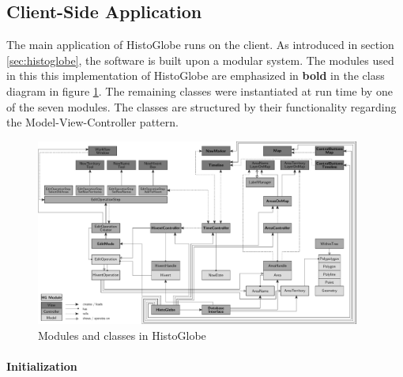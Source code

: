 

\subsection{Client-Side Application} %
\label{sub:client_side_application}

The main application of HistoGlobe runs on the client. As introduced in section \ref{sec:histoglobe}, the software is built upon a modular system. The modules used in this this implementation of HistoGlobe are emphasized in \textbf{bold} in the class diagram in figure \ref{fig:class_diagram}. The remaining classes were instantiated at run time by one of the seven modules. The classes are structured by their functionality regarding the Model-View-Controller pattern.

\begin{figure}
  \centering
  \includegraphics[width=0.95\textwidth]{graphics/development/implementation/class_diagram}
  \vspace{1em}
  \caption{Modules and classes in HistoGlobe}
  \label{fig:class_diagram}
\end{figure}

\newpage %
\paragraph{Initialization} %
\label{par:initialization}

